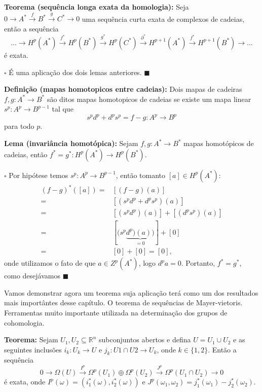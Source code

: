 \documentclass{article}
\begin{document}
	\textbf{Teorema (sequência longa exata da homologia):} Seja $0 \to A^{*} \xrightarrow{f} B^{*} \xrightarrow{g} C^{*} \to 0$ uma sequência curta exata de complexos de cadeias, então a sequência $$
	\dots \to H^{p}(A^{*}) \xrightarrow{f^{*}} H^{p}(B^{*}) \xrightarrow{g^{*}} H^{p}(C^{*}) \xrightarrow{\partial^{*}} H^{p+1}(A^{*}) \xrightarrow{f^{*}} H^{p+1}(B^{*}) \to \dots
	$$
	é exata.
	
	$\square$ É uma aplicação dos dois lemas anteriores. $\blacksquare$
	
	\textbf{Definição (mapas homotopicos entre cadeias):} Dois mapas de cadeiras $f,g : A^{*} \to B^{*}$ são ditos mapas homotopicos de cadeias se existe um mapa linear $s^{p}: A^{p} \to B^{p-1}$ tal que
	$$
	s^{p}d^{p} + d^{p}s^{p} = f-g : A^{p} \to B^{p}
	$$
	para todo $p$.
	
	\textbf{Lema (invariância homotópica):} Sejam $f,g : A^{*} \to B^{*}$ mapas homotópicos de cadeias, então $f^{*} = g^{*}: H^{p}(A^{*}) \to H^{p}(B^{*})$.
	
	$\square$ Por hipótese temos $s^{p}: A^{p} \to B^{p-1}$, então tomanto $[a] \in H^{p}(A^{*})$:
	$$
	\begin{aligned}
	(f-g)^{*}([a]) =& [(f-g)(a)]
	\\
	=& [(s^{p}d^{p} + d^{p}s^{p})(a)]
	\\
	=& [(s^{p}d^{p})(a)] + [(d^{p}s^{p})(a)]
	\\
	=& [(s^{p} \underbrace{d^{p})(a))}_{
		=0}] +[0]
	\\
	=& [0]+[0] = [0],
	\end{aligned}
	$$ 
	onde utilizamos o fato de que $a\in Z^{p}(A^{*})$, logo $d^{p}a = 0$. Portanto, $f^{*} = g^{*}$, como desejávamos $\blacksquare$
	
	Vamos demonstrar agora um teorema suja aplicação terá como um dos resultados mais importântes desse capítulo. O teorema de sequências de Mayer-vietoris. Ferramentas muito importante utilizada na determinação dos grupos de cohomologia.
	
	\textbf{Teorema:} Sejam $U_{1}, U_{2} \subseteq \mathbb{R}^{n}$ subconjuntos abertos e defina $U=U_{1} \cup U_{2}$ e as seguintes inclusões $i_{k}: U_{k} \to U$ e $j_{k}: U{1}\cap U{2} \to U_{k}$, onde $k \in \{1,2\}$. Então a sequência
	$$
	0 \to \Omega(U) \xrightarrow{I^{p}} \Omega^{p}(U_{1}) \oplus \Omega^{p}(U_{2}) \xrightarrow{J^{p}} \Omega^{p}(U_{1} \cap U_{2}) \to 0 
	$$
	é exata, onde $I^{p}(\omega) = (i^{*}_{1}(\omega), i^{*}_{2}(\omega))$ e $J^{p}(\omega_{1}, \omega_{2}) = j^{*}_{1}(\omega_{1})- j^{*}_{2}(\omega_{2})$.
	
\end{document}

